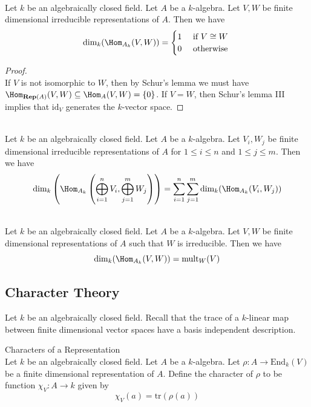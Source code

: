 \documentclass[a4paper]{article}
\begin{document}
\begin{prp}{}{}\\
Let $k$ be an algebraically closed field. Let $A$ be a $k$-algebra. Let $V,W$ be finite dimensional irreducible representations of $A$. Then we have $$\dim_k(\Hom_{A_k}(V,W))=\begin{cases}
1 & \text{ if }V\cong W\\
0 & \text{ otherwise }
\end{cases}$$
\begin{proof}\\
If $V$ is not isomorphic to $W$, then by Schur's lemma we must have $\Hom_{\bold{Rep}(A)}(V,W)\subseteq\Hom_A(V,W)=\{0\}$. If $V=W$, then Schur's lemma III implies that $\text{id}_V$ generates the $k$-vector space. 
\end{proof}
\end{prp}

\begin{prp}{}{}\\
Let $k$ be an algebraically closed field. Let $A$ be a $k$-algebra. Let $V_i,W_j$ be finite dimensional irreducible representations of $A$ for $1\leq i\leq n$ and $1\leq j\leq m$. Then we have $$\dim_k\left(\Hom_{A_k}\left(\bigoplus_{i=1}^nV_i,\bigoplus_{j=1}^mW_j\right)\right)=\sum_{i=1}^n\sum_{j=1}^m\dim_k(\Hom_{A_k}(V_i,W_j))$$
\end{prp}

\begin{crl}{}{}\\
Let $k$ be an algebraically closed field. Let $A$ be a $k$-algebra. Let $V,W$ be finite dimensional representations of $A$ such that $W$ is irreducible. Then we have $$\dim_k(\Hom_{A_k}(V,W))=\text{mult}_W(V)$$
\end{crl}

\subsection{Character Theory}
Let $k$ be an algebraically closed field. Recall that the trace of a $k$-linear map between finite dimensional vector spaces have a basis independent description. 

\begin{defn}{Characters of a Representation}{}\\
Let $k$ be an algebraically closed field. Let $A$ be a $k$-algebra. Let $\rho:A\to\text{End}_k(V)$ be a finite dimensional representation of $A$. Define the character of $\rho$ to be function $\chi_V:A\to k$ given by $$\chi_V(a)=\text{tr}(\rho(a))$$
\end{defn}
\end{document}
